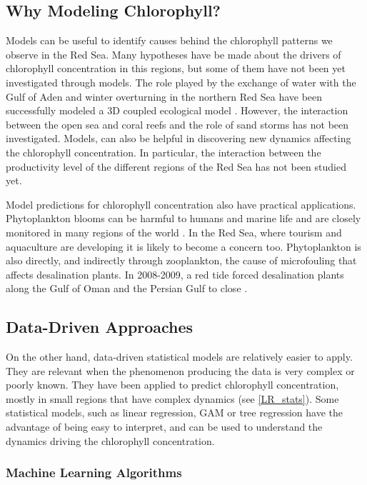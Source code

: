 \subsection{Why Modeling Chlorophyll?}

Models can be useful to identify causes behind the chlorophyll patterns we observe in the Red Sea. Many hypotheses have be made about the drivers of chlorophyll concentration in this regions, but some of them have not been yet investigated through models. The role played by the exchange of water with the Gulf of Aden and winter overturning in the northern Red Sea have been successfully modeled a 3D coupled ecological model \cite{Triantafyllou2014}. However, the interaction between the open sea and coral reefs and the role of sand storms has not been investigated. Models, can also be helpful in discovering new dynamics affecting the chlorophyll concentration. In particular, the interaction between the productivity level of the different regions of the Red Sea has not been studied yet.

Model predictions for chlorophyll concentration also have practical applications. Phytoplankton blooms can be harmful to humans and marine life and are closely monitored in many regions of the world \cite{Pettersson2013}. In the Red Sea, where tourism and aquaculture are developing it is likely to become a concern too. Phytoplankton is also directly, and indirectly through zooplankton, the cause of microfouling that affects desalination plants. In 2008-2009, a red tide forced desalination plants along the Gulf of Oman and the Persian Gulf to close \cite{Richlen2010}.

\subsection{Data-Driven Approaches}

On the other hand, data-driven statistical models are relatively easier to apply. They are relevant when the phenomenon producing the data is very complex or poorly known. They have been applied to predict chlorophyll concentration, mostly in small regions that have complex dynamics (see \ref{LR_stats}). Some statistical models, such as linear regression, GAM or tree regression have the advantage of being easy to interpret, and can be used to understand the dynamics driving the chlorophyll concentration.

\subsubsection{Machine Learning Algorithms}
